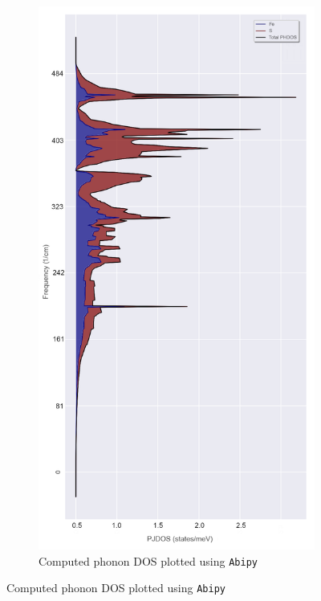 \documentclass[11pt,a4paper]{article}
\begin{document}
\begin{figure}
\centering
\begin{subfigure}[b]{0.55\textwidth}
\centering
\includegraphics[width=\textwidth]{images/dos}
\caption{Computed phonon DOS plotted using \texttt{Abipy}}
\label{fig:phonondos1}
\end{subfigure}

\end{figure}
\end{document}
